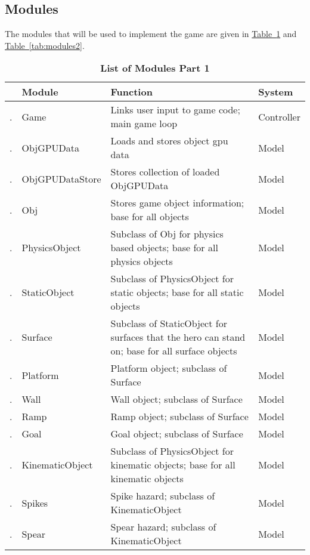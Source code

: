 \documentclass[12pt, titlepage]{article}
\newcounter{ModList}
\newcommand{\printMod}{
    \stepcounter{ModList}
    \arabic{ModList}.
}
\begin{document}
\subsection{Modules}
The modules that will be used to implement the game are given in \hyperref[tab:modules]{Table~\ref*{tab:modules}} and \hyperref[tab:modules2]{Table~\ref*{tab:modules2}}.

\begin{table}[h]
\caption{\bf List of Modules Part 1} \label{tab:modules}
\begin{tabularx}{\textwidth}{p{0.4cm}p{3.5cm}p{6cm}X}
\toprule & {\bf Module} & {\bf Function} & {\bf System}\\
\midrule
\printMod & Game & Links user input to game code; main game loop & Controller\\
\printMod & ObjGPUData & Loads and stores object gpu data & Model\\
\printMod & ObjGPUDataStore & Stores collection of loaded ObjGPUData & Model\\
\printMod & Obj & Stores game object information; base for all objects & Model\\
\printMod & PhysicsObject & Subclass of Obj for physics based objects; base for all physics objects & Model\\
\printMod & StaticObject & Subclass of PhysicsObject for static objects; base for all static objects & Model\\
\printMod & Surface & Subclass of StaticObject for surfaces that the hero can stand on; base for all surface objects & Model\\
\printMod & Platform & Platform object; subclass of Surface & Model\\
\printMod & Wall & Wall object; subclass of Surface & Model\\
\printMod & Ramp & Ramp object; subclass of Surface & Model\\
\printMod & Goal & Goal object; subclass of Surface & Model\\
\printMod & KinematicObject & Subclass of PhysicsObject for kinematic objects; base for all kinematic objects & Model\\
\printMod & Spikes & Spike hazard; subclass of KinematicObject & Model\\
\printMod & Spear & Spear hazard; subclass of KinematicObject & Model\\
\bottomrule
\end{tabularx}
\end{table}
\end{document}
